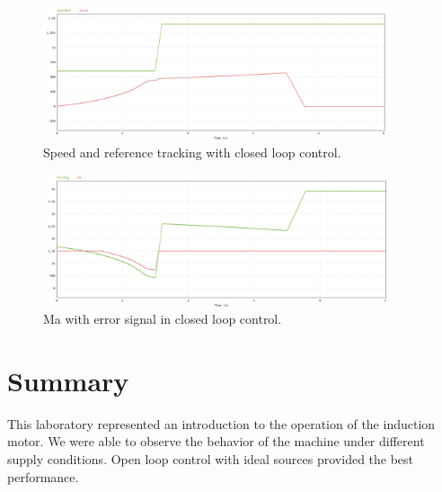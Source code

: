 \documentclass[12pt,a4paper]{report}
\begin{document}
\begin{figure}[H]
    \centering
    \includegraphics[width=0.9\textwidth]{2CSpeed.png}
    \caption{Speed and reference tracking with closed loop control.}
    \label{fig:speed-torque-closed-loop}
\end{figure}

\begin{figure}[H]
    \centering
    \includegraphics[width=0.9\textwidth]{2CModulation.png}
    \caption{Ma with error signal in closed loop control.}
    \label{fig:modulation-strategy}
\end{figure}




\chapter{Summary}
\label{ch:summary}
This laboratory represented an introduction to the operation of the induction motor.
We were able to observe the behavior of the machine under different supply conditions.
Open loop control with ideal sources provided the best performance.

% 
% 

\end{document}
